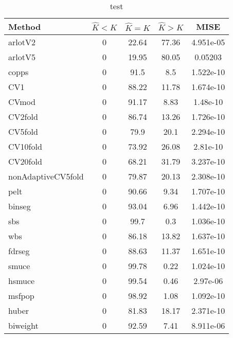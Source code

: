 \begin{table}[ht]
\centering
\begin{tabular}{l|cccc}
  \hline
Method & $\hat{K} < K$ & $\hat{K} = K$ & $\hat{K} > K$ & MISE \\ 
  \hline
arlotV2 &     0 & 22.64 & 77.36 & 4.951e-05 \\ 
  arlotV5 &     0 & 19.95 & 80.05 & 0.05203 \\ 
  copps &     0 &  91.5 &   8.5 & 1.522e-10 \\ 
  CV1 &     0 & 88.22 & 11.78 & 1.674e-10 \\ 
  CVmod &     0 & 91.17 &  8.83 & 1.48e-10 \\ 
  CV2fold &     0 & 86.74 & 13.26 & 1.726e-10 \\ 
  CV5fold &     0 &  79.9 &  20.1 & 2.294e-10 \\ 
  CV10fold &     0 & 73.92 & 26.08 & 2.81e-10 \\ 
  CV20fold &     0 & 68.21 & 31.79 & 3.237e-10 \\ 
  nonAdaptiveCV5fold &     0 & 79.87 & 20.13 & 2.308e-10 \\ 
  pelt &     0 & 90.66 &  9.34 & 1.707e-10 \\ 
  binseg &     0 & 93.04 &  6.96 & 1.442e-10 \\ 
  sbs &     0 &  99.7 &   0.3 & 1.036e-10 \\ 
  wbs &     0 & 86.18 & 13.82 & 1.637e-10 \\ 
  fdrseg &     0 & 88.63 & 11.37 & 1.651e-10 \\ 
  smuce &     0 & 99.78 &  0.22 & 1.024e-10 \\ 
  hsmuce &     0 & 99.54 &  0.46 & 2.97e-06 \\ 
  msfpop &     0 & 98.92 &  1.08 & 1.092e-10 \\ 
  huber &     0 & 81.83 & 18.17 & 2.371e-10 \\ 
  biweight &     0 & 92.59 &  7.41 & 8.911e-06 \\ 
   \hline
\end{tabular}
\caption{test} 
\end{table}
